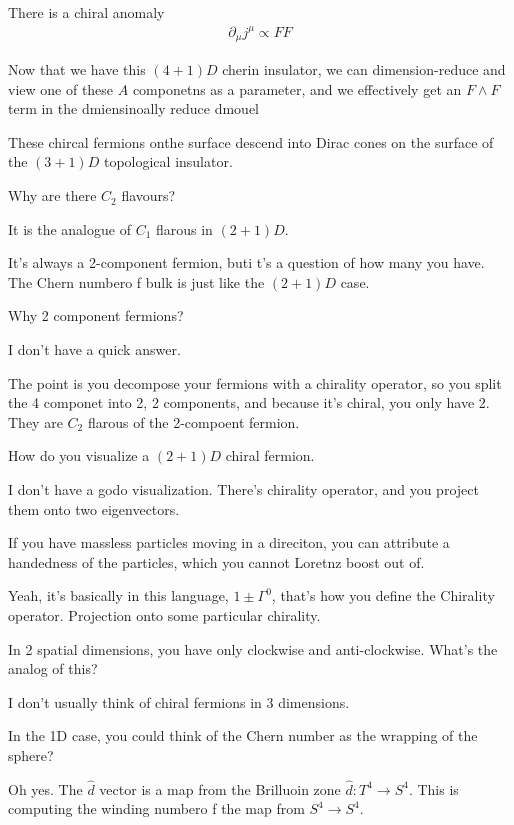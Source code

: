 There is a chiral anomaly
\begin{align}
    \partial_\mu j^\mu \propto FF
\end{align}

Now that we have this $(4+1)D$ cherin insulator,
we can dimension-reduce and view one of these $A$ componetns as a parameter,
and we effectively get an $F\wedge F$ term in the dmiensinoally reduce dmouel

These chircal fermions onthe surface descend into Dirac cones on the surface of
the $(3+1)D$ topological insulator.

\begin{question}
    Why are there $C_2$ flavours?
\end{question}
It is the analogue of $C_1$ flarous in $(2+1)D$.

It's always a 2-component fermion,
buti t's a question of how many you have.
The Chern numbero f bulk is just like the $(2+1)D$ case.

\begin{question}
    Why 2 component fermions?
\end{question}
I don't have a quick answer.

The point is you decompose your fermions
with a chirality operator,
so you split the 4 componet into 2, 2 components,
and because it's chiral,
you only have 2.
They are $C_2$ flarous of the 2-compoent fermion.

\begin{question}
    How do you visualize a $(2+1)D$ chiral fermion.
\end{question}
I don't have a godo visualization.
There's chirality operator,
and you project them onto two eigenvectors.

If you have massless particles moving in a direciton,
you can attribute a handedness of the particles,
which you cannot Loretnz boost out of.

Yeah, it's basically in this language,
$1\pm \Gamma^0$,
that's how you define the Chirality operator.
Projection onto some particular chirality.

\begin{question}
In 2 spatial dimensions,
you have only clockwise and anti-clockwise.
What's the analog of this?
\end{question}
I don't usually think of chiral fermions in 3 dimensions.

\begin{question}
    In the 1D case,
    you could think of the Chern number as the wrapping of the sphere?
\end{question}
Oh yes.
The $\hat{d}$ vector is a map from the Brilluoin zone $\hat{d}:T^4\to S^4$.
This is computing the winding numbero f the map from $S^4\to S^4$.

